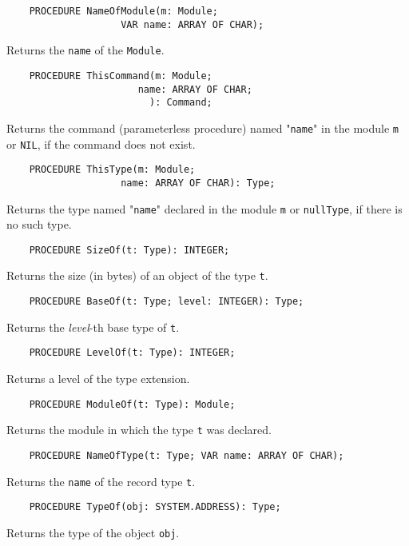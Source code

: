 \verb'    PROCEDURE NameOfModule(m: Module;'\\
\verb'                    VAR name: ARRAY OF CHAR);'

Returns the \verb'name' of the \verb'Module'.

\begin{verbatim}
    PROCEDURE ThisCommand(m: Module;
                       name: ARRAY OF CHAR;
                         ): Command;
\end{verbatim}
Returns the command (parameterless procedure) named "\verb'name'" in
the module {\tt m} or \verb'NIL', if the command does not exist.

\begin{verbatim}
    PROCEDURE ThisType(m: Module;
                    name: ARRAY OF CHAR): Type;
\end{verbatim}
Returns the type named "\verb'name'" declared in the module
{\tt m} or {\tt nullType}, if there is no such type.


\verb'    PROCEDURE SizeOf(t: Type): INTEGER;'

Returns the size (in bytes) of an object of the type {\tt t}.


\verb'    PROCEDURE BaseOf(t: Type; level: INTEGER): Type;'

Returns the {\em level}-th base type of {\tt t}.


\verb'    PROCEDURE LevelOf(t: Type): INTEGER;'

Returns a level of the type extension.


\verb'    PROCEDURE ModuleOf(t: Type): Module;'

Returns the module in which the type {\tt t} was declared.


\verb'    PROCEDURE NameOfType(t: Type; VAR name: ARRAY OF CHAR);'

Returns the \verb'name' of the record type \verb't'.


\verb'    PROCEDURE TypeOf(obj: SYSTEM.ADDRESS): Type;'

Returns the type of the object \verb'obj'.

